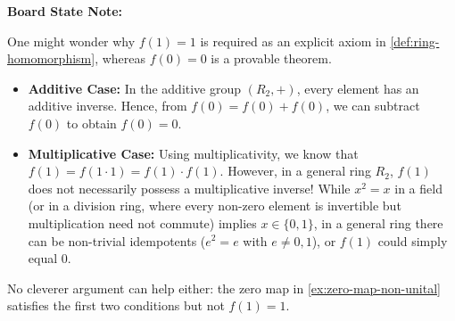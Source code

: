 \begin{content}
\textbf{Board State Note:}
\begin{center}
\end{center}


\begin{steps}[Why $f(1) = 1$ Does Not Follow from $f(ab) = f(a)f(b)$]
One might wonder why $f(1) = 1$ is required as an explicit axiom in \cref{def:ring-homomorphism}, whereas $f(0) = 0$ is a provable theorem.
\begin{itemize}
    \item \textbf{Additive Case:} In the additive group $(R_2, +)$, every element has an additive inverse. Hence, from $f(0) = f(0) + f(0)$, we can subtract $f(0)$ to obtain $f(0) = 0$.
    \item \textbf{Multiplicative Case:} Using multiplicativity, we know that $f(1) = f(1 \cdot 1) = f(1) \cdot f(1)$. However, in a general ring $R_2$, $f(1)$ does not necessarily possess a multiplicative inverse! While $x^2 = x$ in a field (or in a division ring, where every non-zero element is invertible but multiplication need not commute) implies $x \in \{0, 1\}$, in a general ring there can be non-trivial idempotents ($e^2 = e$ with $e \neq 0, 1$), or $f(1)$ could simply equal $0$.
\end{itemize}
No cleverer argument can help either: the zero map in \cref{ex:zero-map-non-unital} satisfies the first two conditions but not $f(1) = 1$.
\end{steps}
\end{content}

